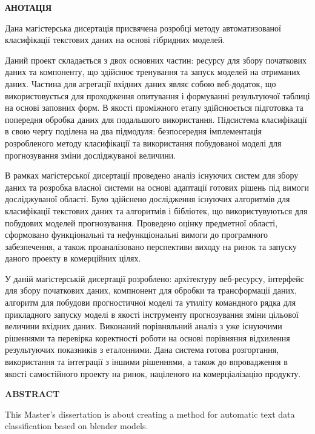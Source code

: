 \begin{center}
	\textbf{\uppercase{Анотація}}
\end{center}

Дана магістерська дисертація присвячена розробці методу автоматизованої класифікації текстових даних на основі гібридних моделей. 

Даний проект складається з двох основних частин: ресурсу для збору початкових даних та компоненту, що здійснює тренування та запуск моделей на отриманих даних. Частина для агрегації вхідних даних являє собою веб-додаток, що використовується для проходження опитування і формуванні результуючої таблиці на основі заповних форм. В якості проміжного етапу здійснюється підготовка та попередня обробка даних для подальшого використання. Підсистема класифікації в свою чергу поділена на два підмодуля: безпосередня імплементація розробленого методу класифікації та використання побудованої моделі для прогнозування зміни досліджуваної величини.

В рамках магістерської дисертації проведено аналіз існуючих систем для збору даних та розробка власної системи на основі адаптації готових рішень під вимоги досліджуваної області. Було здійснено дослідження існуючих алгоритмів для класифікації текстових даних та алгоритмів і бібліотек, що використувуються для побудових моделей прогнозування. Проведено оцінку предметної області, сформовано функціональні та нефункціональні вимоги до програмного забезпечення, а також проаналізовано перспективи виходу на ринок та запуску даного проекту в комерційних цілях.

У даній магістерській дисертації розроблено: архітектуру веб-ресурсу, інтерфейс для збору початкових даних, компнонент для обробки та трансформації даних, алгоритм для побудови прогностичної моделі та утиліту командного рядка для прикладного запуску моделі в якості інструменту прогнозування зміни цільової величини вхідних даних. Виконаний порівняльний аналіз з уже існуючими рішеннями та перевірка коректності роботи на основі порівняння відхилення результуючих показників з еталонними. Дана система готова розгортання, використання та інтеграції з іншими рішеннями, а також до впровадження в якості самостійного проекту на ринок, націленого на комерціалізацію продукту.


\newpage
\begin{center}
	\textbf{\uppercase{Abstract}}
\end{center}

This Master's dissertation is about creating a method for automatic text data classification based on blender models.

